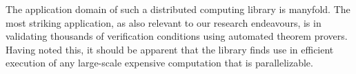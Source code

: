 \documentclass[a4paper,12pt]{article}
\begin{document}
The application domain of such a distributed computing library is
manyfold.  The most striking application, as also relevant to our
research endeavours, is in validating thousands of verification
conditions using automated theorem provers. Having noted this, it
should be apparent that the library finds use in efficient execution
of any large-scale expensive computation that is parallelizable.
\end{document}
